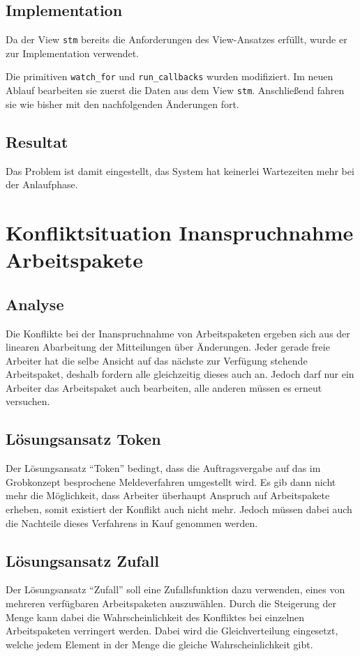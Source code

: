 \subsection{Implementation}
Da der View \verb|stm| bereits die Anforderungen des View-Ansatzes erfüllt,
wurde er zur Implementation verwendet.

Die primitiven \verb|watch_for| und \verb|run_callbacks| wurden modifiziert.
Im neuen Ablauf bearbeiten sie zuerst die Daten aus dem View \verb|stm|.
Anschließend fahren sie wie bisher mit den nachfolgenden Änderungen fort.

\subsection{Resultat}
Das Problem ist damit eingestellt, das System hat keinerlei Wartezeiten mehr bei der Anlaufphase.


\section{Konfliktsituation Inanspruchnahme Arbeitspakete}
\subsection{Analyse}
Die Konflikte bei der Inanspruchnahme von Arbeitspaketen ergeben sich aus der linearen Abarbeitung der Mitteilungen über Änderungen.
Jeder gerade freie Arbeiter hat die selbe Ansicht auf das nächste zur Verfügung stehende Arbeitspaket, deshalb fordern alle gleichzeitig dieses auch an.
Jedoch darf nur ein Arbeiter das Arbeitspaket auch bearbeiten,
alle anderen müssen es erneut versuchen.

\subsection{Lösungsansatz Token}
Der Lösungsansatz ``Token'' bedingt, dass die Auftragsvergabe auf das im Grobkonzept besprochene Meldeverfahren umgestellt wird.
Es gib dann nicht mehr die Möglichkeit, dass Arbeiter überhaupt Anspruch auf Arbeitspakete erheben, somit existiert der Konflikt auch nicht mehr.
Jedoch müssen dabei auch die Nachteile dieses Verfahrens in Kauf genommen werden.

\subsection{Lösungsansatz Zufall}

Der Lösungsansatz ``Zufall'' soll eine Zufallsfunktion dazu verwenden,
eines von mehreren verfügbaren Arbeitspaketen auszuwählen.
Durch die Steigerung der Menge kann dabei die Wahrscheinlichkeit des Konfliktes bei einzelnen Arbeitspaketen verringert werden. Dabei wird die Gleichverteilung eingesetzt, welche jedem Element in der Menge die gleiche Wahrscheinlichkeit gibt.

